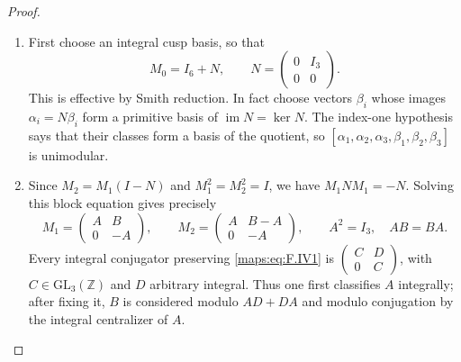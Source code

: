 \begin{proof}
\begin{enumerate}[label=\arabic*.]
\item First choose an integral cusp basis, so that
\[
 M_0=I_6+N,\qquad N=\begin{pmatrix}0&I_3\\0&0\end{pmatrix}.
                                                               \tag{F.IV1}\label{maps:eq:F.IV1}
\]
This is effective by Smith reduction.  In fact choose vectors
$\beta_i$ whose images $\alpha_i=N\beta_i$ form a primitive
basis of $\operatorname{im}N=\ker N$.
The index-one hypothesis says that their classes form a basis
of the quotient, so $[\alpha_1,\alpha_2,\alpha_3,
\beta_1,\beta_2,\beta_3]$ is unimodular.

\item Since $M_2=M_1(I-N)$ and $M_1^2=M_2^2=I$, we have
$M_1NM_1=-N$.  Solving this block equation gives precisely
\[
 M_1=\begin{pmatrix}A&B\\0&-A\end{pmatrix},\qquad
 M_2=\begin{pmatrix}A&B-A\\0&-A\end{pmatrix},\qquad
 A^2=I_3,\quad AB=BA.                                     \tag{F.IV2}\label{maps:eq:F.IV2}
\]
Every integral conjugator preserving \eqref{maps:eq:F.IV1} is
$\begin{pmatrix}C&D\\0&C\end{pmatrix}$, with
$C\in\mathrm{GL}_3(\mathbb Z)$ and $D$ arbitrary integral.
Thus one first classifies $A$ integrally; after fixing it,
$B$ is considered modulo $AD+DA$ and modulo conjugation by
the integral centralizer of $A$.


\end{enumerate}
\end{proof}
